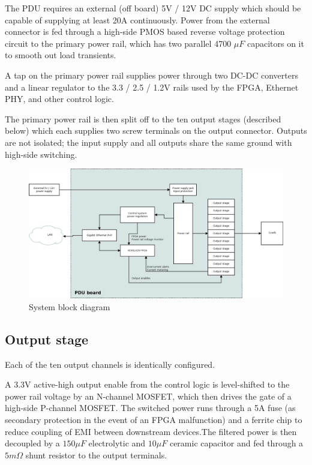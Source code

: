 \documentclass{article}
\begin{document}
The PDU requires an external (off board) 5V / 12V DC supply which should be capable of supplying at least 20A 
continuously. Power from the external connector is fed through a high-side PMOS based reverse voltage protection 
circuit to the primary power rail, which has two parallel 4700 $\mu F$ capacitors on it to smooth out load transients.

A tap on the primary power rail supplies power through two DC-DC converters and a linear regulator to the 3.3 / 2.5 / 
1.2V rails used by the FPGA, Ethernet PHY, and other control logic.

The primary power rail is then split off to the ten output stages (described below) which each supplies two screw 
terminals on the output connector. Outputs are not isolated; the input supply and all outputs share the same ground 
with high-side switching.

\begin{figure}[h!]
\includegraphics[scale=0.25]{system-block.png}
\caption{System block diagram}
\label{system-block}
\end{figure}
\FloatBarrier

\subsection{Output stage}

Each of the ten output channels is identically configured.

A 3.3V active-high output enable from the control logic is level-shifted to the power rail voltage by an N-channel
MOSFET, which then drives the gate of a high-side P-channel MOSFET. The switched power runs through a 5A fuse (as 
secondary protection in the event of an FPGA malfunction) and a ferrite chip to reduce coupling of EMI between 
downstream devices.The filtered power is then decoupled by a $150 \mu F$ electrolytic and $10 \mu F$ ceramic 
capacitor and fed through a $5 m\Omega$ shunt resistor to the output terminals.
\end{document}
